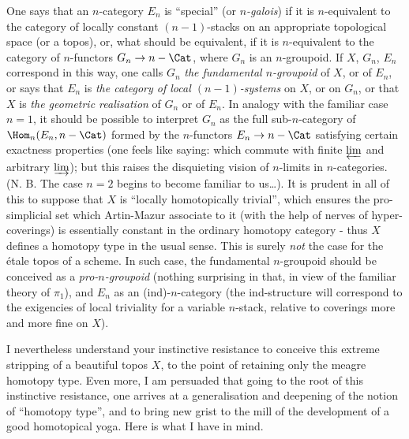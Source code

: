 One says that an $n$-category $E_n$ is ``special'' (or \emph{$n$-galois}) if it is $n$-equivalent to the category of locally constant $(n-1)$-stacks on an appropriate topological space (or a topos), or, what should be equivalent, if it is $n$-equivalent to the category of $n$-functors $G_n \to n-\Cat$, where $G_n$ is an $n$-groupoid. If $X$, $G_n$, $E_n$ correspond in this way, one calls $G_n$ \emph{the fundamental $n$-groupoid} of $X$, or of $E_n$, or says that $E_n$ is \emph{the category of local $(n-1)$-systems} on $X$, or on $G_n$, or that $X$ is \emph{the geometric realisation} of $G_n$ or of $E_n$. In analogy with the familiar case $n = 1$, it should be possible to interpret $G_n$ as the full sub-$n$-category of $\Hom_n(E_n, n-\Cat)$ formed by the $n$-functors $E_n \to n-\Cat$ satisfying certain exactness properties (one feels like saying: which commute with finite $\varprojlim$ and arbitrary $\varinjlim$); but this raises the disquieting vision of $n$-limits in $n$-categories. (N. B. The case $n = 2$ begins to become familiar to us\dots). It is prudent in all of this to suppose that $X$ is ``locally homotopically trivial'', which ensures the pro-simplicial set which Artin-Mazur associate to it (with the help of nerves of hyper-coverings) is essentially constant in the ordinary homotopy category - thus $X$ defines a homotopy type in the usual sense. This is surely \emph{not} the case for the étale topos of a scheme. In such case, the fundamental $n$-groupoid should be conceived as a \emph{pro-$n$-groupoid} (nothing surprising in that, in view of the familiar theory of $\pi_1$), and $E_n$ as an (ind)-$n$-category (the ind-structure will correspond to the exigencies of local triviality for a variable $n$-stack, relative to coverings more and more fine on $X$).

\starsbreak

\label{sec:app16}%
I nevertheless understand your instinctive resistance to conceive this extreme stripping of a beautiful topos $X$, to the point of retaining only the meagre homotopy type. Even more, I am persuaded that going to the root of this instinctive resistance, one arrives at a generalisation and deepening of the notion of ``homotopy type'', and to bring new grist to the mill of the development of a good homotopical yoga. Here is what I have in mind.

